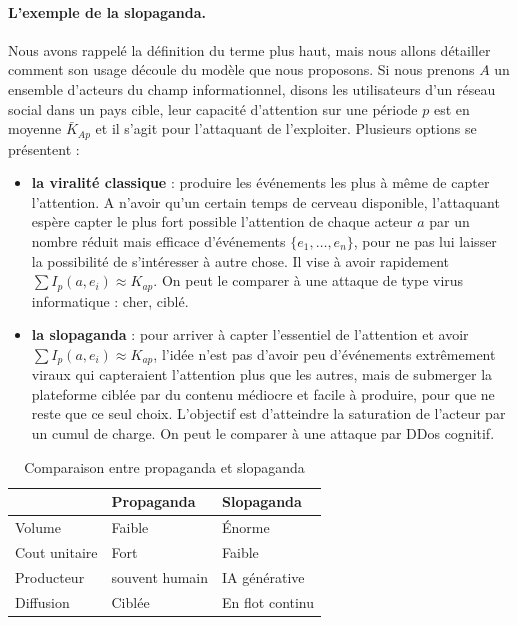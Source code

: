 \documentclass[11pt]{article}
\begin{document}
			\paragraph{L'exemple de la slopaganda.} Nous avons rappelé la définition du terme plus haut, mais nous allons détailler comment son usage découle du modèle que nous proposons. Si nous prenons $A$ un ensemble d'acteurs du champ informationnel, disons les utilisateurs d'un réseau social dans un pays cible, leur capacité d'attention sur une période $p$ est en moyenne $\bar{K}_{Ap}$ et il s'agit pour l'attaquant de l'exploiter. Plusieurs options se présentent : 
			\begin{itemize}
				\item \textbf{la viralité classique} : produire les événements les plus à même de capter l'attention. A n'avoir qu'un certain \og{}temps de cerveau disponible\fg{}, l'attaquant espère capter le plus fort possible l'attention de chaque acteur $a$ par un nombre réduit mais efficace d'événements $\{e_1,\ldots,e_n\}$, pour ne pas lui laisser la possibilité de s'intéresser à autre chose. Il vise à avoir rapidement $\sum I_p(a,e_i) \approx K_{ap}$. On peut le comparer à une attaque de type virus informatique : cher, ciblé. 
				\item \textbf{la slopaganda} : pour arriver à capter l'essentiel de l'attention et avoir $\sum I_p(a,e_i) \approx K_{ap}$, l'idée n'est pas d'avoir peu d'événements extrêmement viraux qui capteraient l'attention plus que les autres, mais de submerger la plateforme ciblée par du contenu médiocre et facile à produire, pour que ne reste que ce seul choix. L'objectif est d'atteindre la saturation de l'acteur par un cumul de charge. On peut le comparer à une attaque par DDos cognitif.
			\end{itemize}
			
			\vspace{0.5cm}
			
			\begin{table}[H]
				\centering
				\begin{tabular}{|l|l|l|}
					\hline 
					 & \textbf{Propaganda} & \textbf{Slopaganda} \\
					\hline 
					Volume & Faible & Énorme \\
					\hline 
					Cout unitaire & Fort & Faible \\
					\hline 
					Producteur & souvent humain  & IA générative \\
					\hline 
					Diffusion & Ciblée & En flot continu \\
					\hline 
				\end{tabular}
				\caption{Comparaison entre propaganda et slopaganda}
			\end{table}
\end{document}
